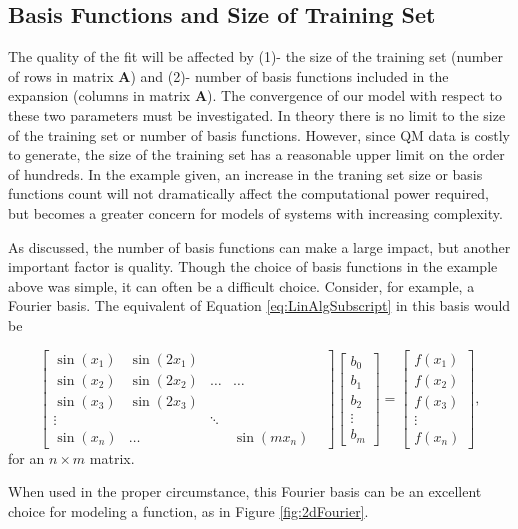 \subsection{Basis Functions and Size of Training Set}\label{Sect:samplesAndFunctions}
\par The quality of the fit will be affected by (1)- the size of the training set (number of rows in matrix $\mathbf{A}$) and (2)- number of basis functions included in the expansion (columns in matrix $\mathbf{A}$). The convergence of our model with respect to these two parameters must be investigated. In theory there is no limit to the size of the training set or number of basis functions. However, since QM data is costly to generate, the size of the training set has a reasonable upper limit on the order of hundreds. In the example given, an increase in the traning set size or basis functions count will not dramatically affect the computational power required, but becomes a greater concern for models of systems with increasing complexity. 
\par As discussed, the number of basis functions can make a large impact, but another important factor is quality. Though the choice of basis functions in the example above was simple, it can often be a difficult choice. Consider, for example, a Fourier basis. The equivalent of Equation \ref{eq:LinAlgSubscript} in this basis would be

\begin{equation} \label{eq:fourierBasis}
\begin{bmatrix}
\sin(x_1) & \sin(2x_1) \\
\sin(x_2) & \sin(2x_2) & \ldots & \ldots \\
\sin(x_3) & \sin(2x_3) \\
\vdots & & \ddots & & \\
\sin(x_n) & \ldots & & \sin(mx_n)
\end{bmatrix}
\begin{bmatrix}
b_0 \\
b_1 \\
b_2 \\
\vdots \\
b_m 
\end{bmatrix}
=
\begin{bmatrix}
f(x_1) \\ 
f(x_2) \\
f(x_3) \\ 
\vdots \\
f(x_n)
\end{bmatrix},
\end{equation}
for an $n\times m$ matrix.
\par When used in the proper circumstance, this Fourier basis can be an excellent choice for modeling a function, as in Figure \ref{fig:2dFourier}.

